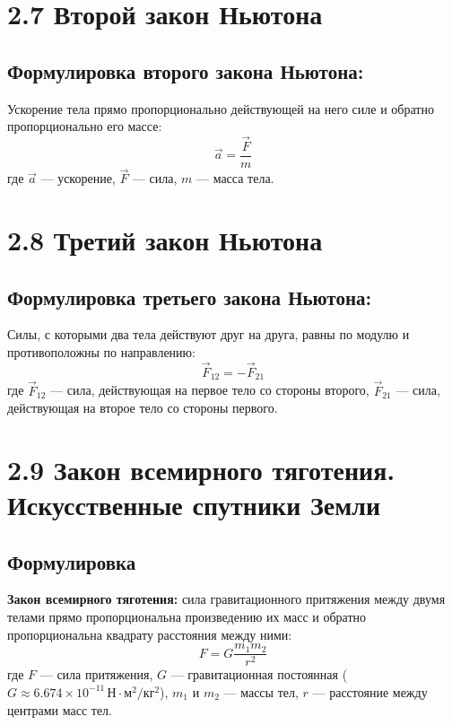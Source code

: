 \documentclass[a4paper, 12pt]{article}
\begin{document}
\section*{2.7 Второй закон Ньютона}

\vspace{-9pt}
\subsection*{Формулировка второго закона Ньютона:}
\vspace{-3pt}
Ускорение тела прямо пропорционально действующей на него силе и обратно пропорционально его массе:
$$ \vec{a} = \frac{\vec{F}}{m} $$
где $\vec{a}$ --- ускорение, $\vec{F}$ --- сила, $m$ --- масса тела.


\section*{2.8 Третий закон Ньютона}

\vspace{-9pt}
\subsection*{Формулировка третьего закона Ньютона:}
\vspace{-3pt}
Силы, с которыми два тела действуют друг на друга, равны по модулю и противоположны по направлению:
$$ \vec{F}_{12} = -\vec{F}_{21} $$
где $\vec{F}_{12} $ --- сила, действующая на первое тело со стороны второго, $\vec{F}_{21} $ --- сила, действующая на второе тело со стороны первого.


\section*{2.9 Закон всемирного тяготения. Искусственные спутники Земли}

\vspace{-9pt}
\subsection*{Формулировка}
\vspace{-3pt}
\textbf{Закон всемирного тяготения:} сила гравитационного притяжения между двумя телами прямо пропорциональна произведению их масс и обратно пропорциональна квадрату расстояния между ними:
$$ F = G \frac{m_1 m_2}{r^2} $$
где $F $ --- сила притяжения, $G $ --- гравитационная постоянная ($G \approx 6.674 \times 10^{-11} \, \text{Н} \cdot \text{м}^2/\text{кг}^2 $), $m_1 $ и $m_2 $ --- массы тел, $r $ --- расстояние между центрами масс тел.
\end{document}
